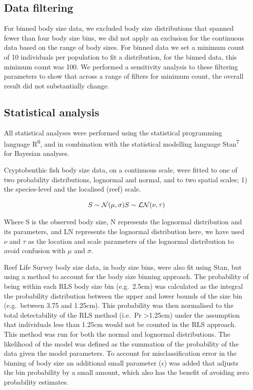 \documentclass[
]{agujournal2019}
\begin{document}
\hypertarget{data-filtering}{%
\subsection{Data filtering}\label{data-filtering}}

For binned body size data, we excluded body size distributions that
spanned fewer than four body size bins, we did not apply an exclusion
for the continuous data based on the range of body sizes. For binned
data we set a minimum count of 10 individuals per population to fit a
distribution, for the binned data, this minimum count was 100. We
performed a sensitivity analysis to these filtering parameters to show
that across a range of filters for minimum count, the overall result did
not substantially change.

\hypertarget{statistical-analysis}{%
\subsection{Statistical analysis}\label{statistical-analysis}}

All statistical analyses were performed using the statistical
programming language R\textsuperscript{6}, and in combination with the
statistical modelling language Stan\textsuperscript{7} for Bayesian
analyses.

Cryptobenthic fish body size data, on a continuous scale, were fitted to
one of two probability distributions, lognormal and normal, and to two
spatial scales; 1) the species-level and the localised (reef) scale.

\[
S \sim \mathcal{N}(\mu, \sigma)\\
S \sim \mathcal{LN}(\nu, \tau)
\]

Where S is the observed body size, N represents the lognormal
distribution and its parameters, and LN represents the lognormal
distribution here, we have used \(\nu\) and \(\tau\) as the location and
scale parameters of the lognormal distribution to avoid confusion with
\(\mu\) and \(\sigma\).

Reef Life Survey body size data, in body size bins, were also fit using
Stan, but using a method to account for the body size binning approach.
The probability of being within each RLS body size bin (e.g.~2.5cm) was
calculated as the integral the probability distribution between the
upper and lower bounds of the size bin (e.g.~between 3.75 and 1.25cm).
This probability was then normalised to the total detectability of the
RLS method (i.e.~Pr \textgreater1.25cm) under the assumption that
individuals less than 1.25cm would not be counted in the RLS approach.
This method was run for both the normal and lognormal distributions. The
likelihood of the model was defined as the summation of the probability
of the data given the model parameters. To account for misclassification
error in the binning of body size an additional small parameter
(\(\epsilon\)) was added that adjusts the bin probability by a small
amount, which also has the benefit of avoiding zero probability
estimates.
\end{document}
